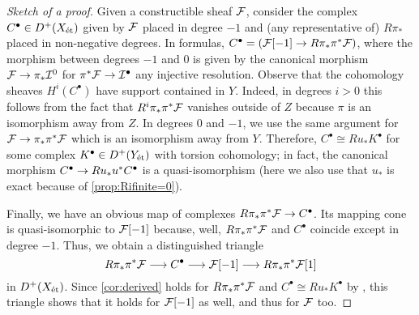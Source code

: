 \documentclass[a4paper, 10pt, oneside, DIV=9, chapterprefix=true, numbers=enddot, bibliography=totoc]{scrbook}
\begin{document}
\begin{proof}[Sketch of a proof]
	Given a constructible sheaf $\mathcal{F}$, consider the complex $C^\bullet\in D^+(X_{\mathrm{\acute{e}t}})$ given by $\mathcal{F}$ placed in degree $-1$ and (any representative of) $R\pi_*$ placed in non-negative degrees. In formulas, $C^\bullet=(\Ff[-1]\morphism R\pi_*\pi^*\Ff)$, where the morphism between degrees $-1$ and $0$ is given by the canonical morphism $\Ff\morphism \pi_*\Ii^0$ for $\pi^*\Ff\morphism \Ii^\bullet$ any injective resolution. Observe that the cohomology sheaves $H^i(C^\bullet)$ have support contained in $Y$. Indeed, in degrees $i>0$ this follows from the fact that $R^i\pi_*\pi^*\mathcal{F}$ vanishes outside of $Z$ because $\pi$ is an isomorphism away from $Z$. In degrees $0$ and $-1$, we use the same argument for $\Ff\morphism \pi_*\pi^*\Ff$ which is an isomorphism away from $Y$. Therefore, $C^\bullet\cong Ru_*K^\bullet$ for some complex $K^\bullet\in D^+(Y_{\mathrm{\acute{e}t}})$ with torsion cohomology; in fact, the canonical morphism $C^\bullet\morphism Ru_*u^*C^\bullet$ is a quasi-isomorphism (here we also use that $u_*$ is exact because of \cref{prop:Rifinite=0}).
	
	Finally, we have an obvious map of complexes $R\pi_*\pi^*\Ff\morphism C^\bullet$. Its mapping cone is quasi-isomorphic to $\mathcal{F}[-1]$ because, well, $R\pi_*\pi^*\mathcal{F}$ and $C^\bullet$ coincide except in degree $-1$. Thus, we obtain a distinguished triangle
	\begin{equation*}
		R\pi_*\pi^*\Ff\morphism C^\bullet\morphism \Ff[-1]\morphism R\pi_*\pi^*\Ff[1]
	\end{equation*}
	in $D^+(X_{\mathrm{\acute{e}t}})$. Since \cref{cor:derived} holds for $R\pi_*\pi^*\mathcal{F}$ and $C^\bullet\cong Ru_*K^\bullet$ by \itememph{*}, this triangle shows that it holds for $\mathcal{F}[-1]$ as well, and thus for $\mathcal{F}$ too. 
\end{proof}
\end{document}
